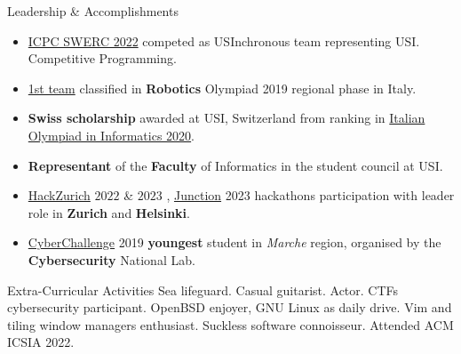 \documentclass{cv} %
\begin{document}
\begin{rSection}{Leadership \& Accomplishments}
    \begin{itemize}
        \item \href{https://swerc.eu/2022/teams/}{ICPC SWERC 2022}
              competed as USInchronous team representing USI. Competitive Programming.

        \item \href{https://www.makerslab.it/olimpiadi-robotiche-ancona-2019/}{1st team}
              classified in \textbf{Robotics} Olympiad 2019 regional phase in Italy.

        \item \textbf{Swiss scholarship} awarded at USI, Switzerland from ranking in
              \href{https://www.olimpiadi-informatica.it/index.php/selezione-territoriale-20.html}{Italian Olympiad in Informatics 2020}.

        \item \textbf{Representant} of the \textbf{Faculty} of Informatics in the student council at USI.
        \item \href{https://hackzurich.com/}{HackZurich} $2022$ \& $2023$ , \href{https://www.junction2023.com/}{Junction} 2023
              hackathons participation with leader role in \textbf{Zurich} and \textbf{Helsinki}.

        \item \href{https://cyberchallenge.it/}{CyberChallenge} 2019 \textbf{youngest} student
              in \textit{Marche} region, organised by the \textbf{Cybersecurity} National Lab.
    \end{itemize}
\end{rSection}

\begin{rSection}{Extra-Curricular Activities}
    Sea lifeguard.
    Casual guitarist.
    Actor.
    CTFs cybersecurity participant.
    OpenBSD enjoyer, GNU \text{+} Linux as daily drive.
    Vim and tiling window managers enthusiast.
    Suckless software connoisseur.
    Attended ACM ICSIA 2022.
\end{rSection}
\end{document}
